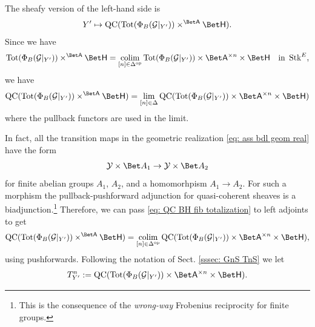 \documentclass[10pt]{amsart}
\theoremstyle{remark}
\newcommand{\te}{\text}
\newcommand{\on}{\operatorname}
\newcommand{\cG}{\mathcal{G}}
\newcommand{\cY}{\mathcal{Y}}
\newcommand{\QC}{\on{QC}}
\newcommand{\Stk}{\on{Stk}}
\DeclareMathOperator{\op}{op}
\DeclareMathOperator{\colim}{colim}
\newcommand{\Tot}{\on{Tot}}
\newcommand{\sfA}{\mathsf{A}}
\begin{document}
The sheafy version of the left-hand side is 
\begin{equation}\label{eq: LHS sheafy}
    Y'\mapsto \QC(\Tot(\Phi_B(\cG|_{Y'}))\times^{\Bet \sfA} \Bet \mathsf{H}).
\end{equation}
Since we have
\begin{equation}\label{eq: ass bdl geom real}
    \Tot(\Phi_B(\cG|_{Y'}))\times^{\Bet \sfA} \Bet \mathsf{H} = \colim_{[n]\in\Delta^{\op}}\Tot(\Phi_B(\cG|_{Y'}))\times \Bet \sfA^{\times n}\times \Bet \mathsf{H} \quad \te{in }\Stk^E,
\end{equation}
we have
\begin{equation}\label{eq: QC BH fib totalization}
    \QC(\Tot(\Phi_B(\cG|_{Y'}))\times^{\Bet \sfA} \Bet \mathsf{H}) 
    = \lim_{[n]\in\Delta} \QC(\Tot(\Phi_B(\cG|_{Y'}))\times \Bet \sfA^{\times n}\times \Bet \mathsf{H})
\end{equation}
where the pullback functors are used in the limit. 
\medskip

In fact, all the transition maps in the geometric realization \eqref{eq: ass bdl geom real} have the form 
\[\cY\times \Bet A_1\rightarrow \cY\times\Bet A_2\]
for finite abelian groups $A_1$, $A_2$, and a homomorhpism $A_1\rightarrow A_2$. For such a morphism the pullback-pushforward adjunction for quasi-coherent sheaves is a biadjunction.\footnote{This is the consequence of the \emph{wrong-way} Frobenius reciprocity for finite groups.} Therefore, we can pass \eqref{eq: QC BH fib totalization} to left adjoints to get
\begin{equation}\label{eq: QC BH fib geom real}
    \QC(\Tot(\Phi_B(\cG|_{Y'}))\times^{\Bet \sfA} \Bet \mathsf{H}) 
    = \colim_{[n]\in\Delta^{\op}} \QC(\Tot(\Phi_B(\cG|_{Y'}))\times \Bet \sfA^{\times n}\times \Bet \mathsf{H}),
\end{equation}
using pushforwards. Following the notation of Sect. \ref{sssec: GnS TnS} we let
\[T^n_{Y'}:= \QC(\Tot(\Phi_B(\cG|_{Y'}))\times \Bet \sfA^{\times n}\times \Bet \mathsf{H}).\]
\end{document}
